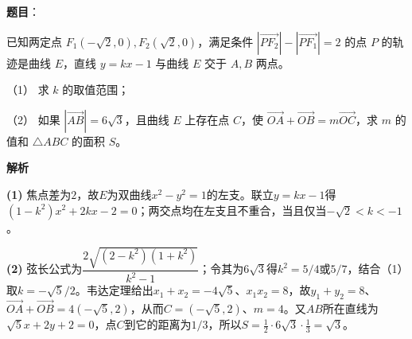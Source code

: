 \begin{answer}

\textbf{题目}：

已知两定点 $F_1(-\sqrt2,0),F_2(\sqrt2,0)$，满足条件 $\left|\overrightarrow{PF_2}\right|-\left|\overrightarrow{PF_1}\right|=2$ 的点 $P$ 的轨迹是曲线 $E$，直线 $y=kx-1$ 与曲线 $E$ 交于 $A,B$ 两点。

（1） 求 $k$ 的取值范围；

（2） 如果 $|\overrightarrow{AB}|=6\sqrt3$，且曲线 $E$ 上存在点 $C$，使 $\overrightarrow{OA}+\overrightarrow{OB}=m\overrightarrow{OC}$，求 $m$ 的值和 $\triangle ABC$ 的面积 $S$。

\textbf{解析}

\textbf{(1)} 焦点差为$2$，故$E$为双曲线$x^2-y^2=1$的左支。联立$y=kx-1$得$(1-k^2)x^2+2kx-2=0$；两交点均在左支且不重合，当且仅当$-\sqrt2<k<-1$。

\textbf{(2)} 弦长公式为$\dfrac{2\sqrt{(2-k^2)(1+k^2)}}{k^2-1}$；令其为$6\sqrt3$得$k^2=5/4$或$5/7$，结合（1）取$k=-\sqrt5/2$。韦达定理给出$x_1+x_2=-4\sqrt5$、$x_1x_2=8$，故$y_1+y_2=8$、$\overrightarrow{OA}+\overrightarrow{OB}=4(-\sqrt5,2)$，从而$C=(-\sqrt5,2)$、$m=4$。又$AB$所在直线为$\sqrt5x+2y+2=0$，点$C$到它的距离为$1/3$，所以$S=\frac12\cdot6\sqrt3\cdot\frac13=\sqrt3$。



\end{answer}